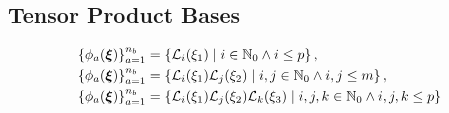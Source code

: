 \subsection{Tensor Product Bases}

\begin{equation}
\begin{aligned}
\left\{ \phi_a(\boldsymbol{\xi}) \right\}_{a=1}^{n_b} &=
  \left\{ \mathcal{L}_i(\xi_1) \; | \; i \in \mathbb{N}_0 \land i \leq p
  \right\}, \\
\left\{ \phi_a(\boldsymbol{\xi}) \right\}_{a=1}^{n_b} &=
  \left\{ \mathcal{L}_i(\xi_1) \mathcal{L}_j(\xi_2) \; | \; i,j \in
  \mathbb{N}_0 \land i,j \leq m \right\}, \\
\left\{ \phi_a(\boldsymbol{\xi}) \right\}_{a=1}^{n_b} &=
  \left\{ \mathcal{L}_i(\xi_1) \mathcal{L}_j(\xi_2) \mathcal{L}_k(\xi_3) \; |
  \; i,j,k \in \mathbb{N}_0 \land i,j,k \leq p \right\}
\end{aligned}
\label{eq:tensor_basis}
\end{equation}

